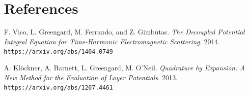 \documentclass{article}[12pt]
\begin{document}
	\section{References}
	\begin{thebibliography}{9}
		F. Vico, L. Greengard, M. Ferrando, and Z. Gimbutas. 
		\textit{The Decoupled Potential Integral Equation for Time-Harmonic Electromagnetic Scattering}. 
		2014. \\\texttt{https://arxiv.org/abs/1404.0749}
		
		A. Klöckner, A. Barnett, L. Greengard, M. O'Neil.
		\textit{Quadrature by Expansion: A New Method for the Evaluation of Layer Potentials}.
		2013. \\\texttt{https://arxiv.org/abs/1207.4461}
		
	\end{thebibliography}
		
	
\end{document}
